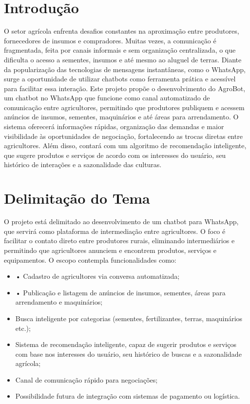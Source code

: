 \documentclass[
  article,
  a4paper,
  12pt,
  fleqn,
  oneside,
  chapter = TITLE,
  section = TITLE,
]{abntex2}
\affil{Acadêmico de Sistemas de Informação; UNOESC; Chapecó}%
\affil{Acadêmico de Sistemas de Informação; UNOESC; Chapecó}%
\affil{Acadêmico de Sistemas de Informação; UNOESC; Chapecó}%
\affil{Especialista em Desenvolvimento de Aplicações Web; UNOPAR; Chapecó}%
\begin{document}
\pretextual

\begin{paginadetitulo}


\end{paginadetitulo}

\textual


\section{Introdução}\label{sec:intro}

O setor agrícola enfrenta desafios constantes na aproximação entre produtores, fornecedores de insumos e compradores. Muitas vezes, a comunicação é fragmentada, feita por canais informais e sem organização centralizada, o que dificulta o acesso a sementes, insumos e até mesmo ao aluguel de terras.
Diante da popularização das tecnologias de mensagens instantâneas, como o WhatsApp, surge a oportunidade de utilizar chatbots como ferramenta prática e acessível para facilitar essa interação.
Este projeto propõe o desenvolvimento do AgroBot, um chatbot no WhatsApp que funcione como canal automatizado de comunicação entre agricultores, permitindo que produtores publiquem e acessem anúncios de insumos, sementes, maquinários e até áreas para arrendamento. O sistema oferecerá informações rápidas, organização das demandas e maior visibilidade às oportunidades de negociação, fortalecendo as trocas diretas entre agricultores. Além disso, contará com um algoritmo de recomendação inteligente, que sugere produtos e serviços de acordo com os interesses do usuário, seu histórico de interações e a sazonalidade das culturas.


\section{Delimitação do Tema}\label{ssec:teor}

O projeto está delimitado ao desenvolvimento de um chatbot para WhatsApp, que servirá como plataforma de intermediação entre agricultores. O foco é facilitar o contato direto entre produtores rurais, eliminando intermediários e permitindo que agricultores anunciem e encontrem produtos, serviços e equipamentos. O escopo contempla funcionalidades como:

\begin{itemize}
  \item •	Cadastro de agricultores via conversa automatizada;
  \item •	Publicação e listagem de anúncios de insumos, sementes, áreas para arrendamento e maquinários;
  \item Busca inteligente por categorias (sementes, fertilizantes, terras, maquinários etc.);
  \item Sistema de recomendação inteligente, capaz de sugerir produtos e serviços com base nos interesses do usuário, seu histórico de buscas e a sazonalidade agrícola;
  \item Canal de comunicação rápido para negociações;
  \item Possibilidade futura de integração com sistemas de pagamento ou logística.
\end{itemize}
\end{document}
